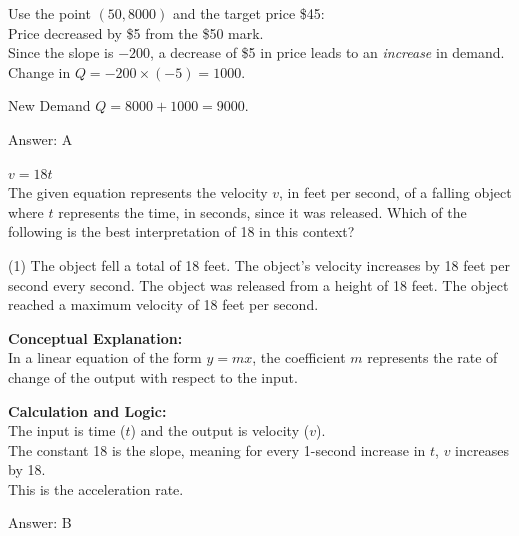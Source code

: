 \documentclass[11pt,paper=a4,answers]{exam}
\begin{document}
\begin{questions}
\begin{solution}
Use the point $(50, 8000)$ and the target price \$45: \\
Price decreased by \$5 from the \$50 mark. \\
Since the slope is $-200$, a decrease of \$5 in price leads to an \textit{increase} in demand. \\
Change in $Q = -200 \times (-5) = 1000$.

\vspace{10pt}

New Demand $Q = 8000 + 1000 = 9000$.

\vspace{25pt}

Answer: \colorbox{yellow!100}{A}
\end{solution}

\vspace{40pt}

\question
$v = 18t$ \\
The given equation represents the velocity $v$, in feet per second, of a falling object where $t$ represents the time, in seconds, since it was released. Which of the following is the best interpretation of 18 in this context?
\begin{tasks}(1)
    \task The object fell a total of 18 feet.
    \task The object's velocity increases by 18 feet per second every second.
    \task The object was released from a height of 18 feet.
    \task The object reached a maximum velocity of 18 feet per second.
\end{tasks}

\begin{solution}
\textbf{Conceptual Explanation:} \\
In a linear equation of the form $y = mx$, the coefficient $m$ represents the rate of change of the output with respect to the input.

\vspace{20pt}

\textbf{Calculation and Logic:} \\
The input is time ($t$) and the output is velocity ($v$). \\
The constant 18 is the slope, meaning for every 1-second increase in $t$, $v$ increases by 18. \\
This is the acceleration rate.

\vspace{25pt}

Answer: \colorbox{yellow!100}{B}
\end{solution}


\end{questions}
\end{document}
